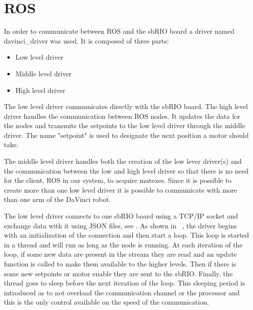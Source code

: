 \section{ROS}\label{sec:ros}

In order to communicate between ROS and the sbRIO board a driver named davinci\_driver\cite{davinci_driver} was used. It is composed of three parts:

\begin{itemize}
\item Low level driver
\item Middle level driver
\item High level driver
\end{itemize}


The low level driver communicates directly with the sbRIO board. The high level driver handles the communication between ROS nodes. It updates the data for the nodes and transmits the setpoints to the low level driver through the middle driver. The name "setpoint" is used to designate the next position a motor should take.

The middle level driver handles both the creation of the low lever driver(s) and the communication between the low and high level driver so that there is no need for the client, ROS in our system, to acquire mutexes. Since it is possible to create more than one low level driver it is possible to communicate with more than one arm of the DaVinci robot.

The low level driver connects to one sbRIO board using a TCP/IP socket and exchange data with it using \gls{JSON} files, see . As shown in ~, the driver begins with an initialization of the connection and then start a loop. This loop is started in a thread and will run as long as the node is running. At each iteration of the loop, if some new data are present in the stream they are read and an update function is called to make them available to the higher levels. Then if there is some new setpoints or motor enable they are sent to the sbRIO. Finally, the thread goes to sleep before the next iteration of the loop. This sleeping period is introduced as to not overload the communication channel or the processor and this is the only control available on the speed of the communication.

